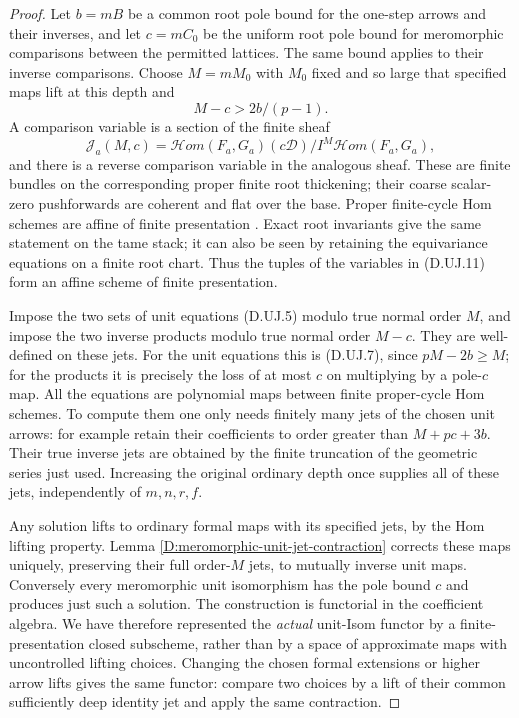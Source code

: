 \begin{proof}
Let $b=mB$ be a common root pole bound for the one-step
arrows and their inverses, and let $c=mC_0$ be the uniform
root pole bound for meromorphic comparisons between the
permitted lattices. The same bound applies to their inverse
comparisons. Choose $M=mM_0$ with $M_0$ fixed and so large
that specified maps lift at this depth and
\[
                    M-c>2b/(p-1).                     \tag{D.UJ.10}
\]
A comparison variable is a section of the finite sheaf
\[
 \mathcal J_{a}(M,c)=
 \mathcal Hom(F_a,G_a)(c\mathcal D)\big/
                         I^M\mathcal Hom(F_a,G_a),     \tag{D.UJ.11}
\]
and there is a reverse comparison variable in the analogous
sheaf. These are finite bundles on the corresponding
proper finite root thickening; their coarse scalar-zero
pushforwards are coherent and flat over the base. Proper
finite-cycle Hom schemes are affine of finite presentation
\citep[Proposition~99.3.10, Tag~08K6]{StacksUnitJetTransferD}.
Exact root invariants give the same statement on the tame
stack; it can also be seen by retaining the equivariance
equations on a finite root chart. Thus the tuples of the
variables in (D.UJ.11) form an affine scheme of finite
presentation.

Impose the two sets of unit equations (D.UJ.5) modulo true
normal order $M$, and impose the two inverse products
modulo true normal order $M-c$. They are well-defined on
these jets. For the unit equations this is (D.UJ.7), since
$pM-2b\geq M$; for the products it is precisely the loss
of at most $c$ on multiplying by a pole-$c$ map. All the
equations are polynomial maps between finite proper-cycle
Hom schemes. To compute them one only needs finitely many
jets of the chosen unit arrows: for example retain their
coefficients to order greater than $M+pc+3b$. Their true
inverse jets are obtained by the finite truncation of the
geometric series just used. Increasing the original
ordinary depth once supplies all of these jets, independently
of $m,n,r,f$.

Any solution lifts to ordinary formal maps with its specified
jets, by the Hom lifting property. Lemma
\ref{D:meromorphic-unit-jet-contraction} corrects these
maps uniquely, preserving their full order-$M$ jets, to
mutually inverse unit maps. Conversely every meromorphic
unit isomorphism has the pole bound $c$ and produces just
such a solution. The construction is functorial in the
coefficient algebra. We have therefore represented the
\emph{actual} unit-Isom functor by a finite-presentation
closed subscheme, rather than by a space of approximate
maps with uncontrolled lifting choices. Changing the
chosen formal extensions or higher arrow lifts gives the
same functor: compare two choices by a lift of their common
sufficiently deep identity jet and apply the same contraction.


\end{proof}
